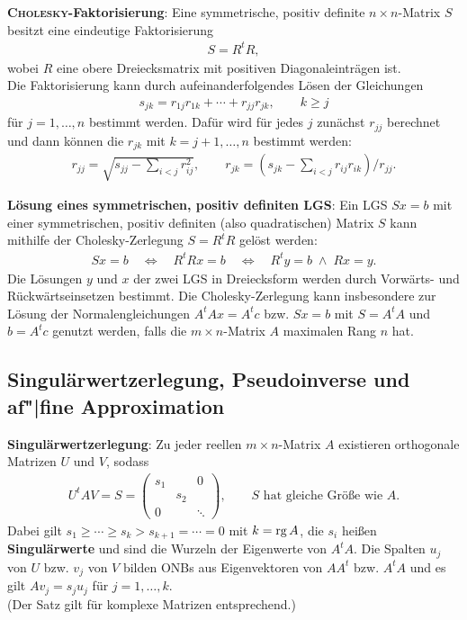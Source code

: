 \textbf{\textsc{Cholesky}-Faktorisierung}:
Eine symmetrische, positiv definite $n \times n$-Matrix $S$ besitzt eine
eindeutige Faktorisierung
\begin{align*}
    S = R^t R,
\end{align*}
wobei $R$ eine obere Dreiecksmatrix mit positiven Diagonaleinträgen ist. \\
Die Faktorisierung kann durch aufeinanderfolgendes Lösen der Gleichungen
\begin{align*}
    s_{jk} = r_{1j} r_{1k} + \dotsb + r_{jj} r_{jk}, \qquad k \ge j
\end{align*}
für $j = 1, \dotsc, n$ bestimmt werden.
Dafür wird für jedes $j$ zunächst $r_{jj}$
berechnet und dann können die $r_{jk}$ mit $k = j + 1, \dotsc, n$
bestimmt werden:
\begin{align*}
    r_{jj} = \sqrt{s_{jj} - \sum_{i < j} r_{ij}^2}, \qquad
    r_{jk} = \left(s_{jk} - \sum_{i < j} r_{ij} r_{ik}\right) / r_{jj}.
\end{align*}

\linie

\textbf{Lösung eines symmetrischen, positiv definiten LGS}:
Ein LGS $Sx = b$ mit einer symmetrischen, positiv definiten
(also quadratischen) Matrix $S$ kann mithilfe der Cholesky-Zerlegung
$S = R^t R$ gelöst werden:
\begin{align*}
    Sx = b \quad\Leftrightarrow\quad
    R^t Rx = b \quad\Leftrightarrow\quad
    R^t y = b \;\land\; Rx = y.
\end{align*}
Die Lösungen $y$ und $x$ der zwei LGS in Dreiecksform werden durch
Vorwärts- und Rückwärtseinsetzen bestimmt.
Die Cholesky-Zerlegung kann insbesondere zur Lösung der Normalengleichungen
$A^t Ax = A^t c$ bzw. $Sx = b$ mit $S = A^t A$ und $b = A^t c$ genutzt werden,
falls die $m \times n$-Matrix $A$ maximalen Rang $n$ hat.

\subsection{%
    Singulärwertzerlegung, Pseudoinverse und af"|fine Approximation%
}

\textbf{Singulärwertzerlegung}:
Zu jeder reellen $m \times n$-Matrix $A$ existieren orthogonale Matrizen $U$
und $V$, sodass
\begin{align*}
    U^t A V = S =
    \begin{pmatrix}s_1 & & 0 \\ & s_2 & \\ 0 & & \ddots\end{pmatrix}, \qquad
    S \text{ hat gleiche Größe wie } A.
\end{align*}
Dabei gilt $s_1 \ge \dotsb \ge s_k > s_{k+1} = \dotsb = 0$
mit $k = \operatorname{rg} A$,
die $s_i$ heißen \textbf{Singulärwerte} und sind die Wurzeln der Eigenwerte
von $A^t A$.
Die Spalten $u_j$ von $U$ bzw. $v_j$ von $V$ bilden ONBs aus Eigenvektoren
von $A A^t$ bzw. $A^t A$ und es gilt
$A v_j = s_j u_j$ für $j = 1, \dotsc, k$. \\
(Der Satz gilt für komplexe Matrizen entsprechend.)

